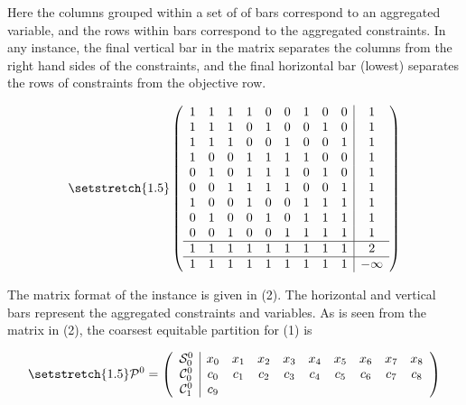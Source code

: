 \documentclass[11pt]{article} %
\newcommand{\cC}{{\cal C}}
\newcommand{\cS}{{\cal S}}
\begin{document}
	Here the columns grouped within a set of of bars correspond to an aggregated variable, and the rows within bars correspond to the aggregated constraints.  In any instance, the final vertical bar in the matrix separates the columns from the right hand sides of the constraints, and the final horizontal bar (lowest) separates the rows of constraints from the objective row.
	
	\begin{equation}\setstretch{1.5}
	\begin{pmatrix}
	\begin{array}{ccccccccc|c}
	1 & 1 & 1 & 1 & 0 & 0 & 1 & 0 & 0 & 1 \\ 
	1 & 1 & 1 & 0 & 1 & 0 & 0 & 1 & 0 &  1 \\ 
	1 & 1 & 1 & 0 & 0 & 1 & 0 & 0 & 1 & 1 \\ 
	1 & 0 & 0 & 1 & 1 & 1 & 1 & 0 & 0 & 1 \\ 
	0 & 1 & 0 & 1 & 1 & 1 & 0 & 1 & 0 & 1 \\ 
	0 & 0 & 1 & 1 & 1 & 1 & 0 & 0 & 1 & 1 \\ 
	1 & 0 & 0 & 1 & 0 & 0 & 1 & 1 & 1 & 1 \\ 
	0 & 1 & 0 & 0 & 1 & 0 & 1 & 1 & 1 & 1 \\ 
	0 & 0 & 1 & 0 & 0 & 1 & 1 & 1 & 1 & 1 \\ 
	\hline
	1 & 1 & 1 & 1 & 1 & 1 & 1 & 1 & 1 & 2 \\ 
	\hline
	1 & 1 & 1 & 1 & 1 & 1 & 1 & 1 & 1 & -\infty
	\end{array}
	\end{pmatrix}
	\end{equation}
	
	The matrix format of the instance is given in (2).  The horizontal and vertical bars represent the aggregated constraints and variables. As is seen from the matrix in (2), the coarsest equitable partition for (1) is
	
	\begin{equation}\setstretch{1.5}
	\mathcal{P}^0 = 
	\begin{pmatrix} 
	\begin{array}{c|ccccccccc}
	\cS_0^0 & x_0 & x_1 & x_2 & x_3 & x_4 & x_5 & x_6 & x_7 & x_8 \\
	\cC_0^0 & c_0 & c_1 & c_2 & c_3 & c_4 & c_5 & c_6 & c_7 & c_8 \\
	\cC_1^0 & c_9
	\end{array}
	\end{pmatrix} 
	\end{equation}
	
\end{document}
